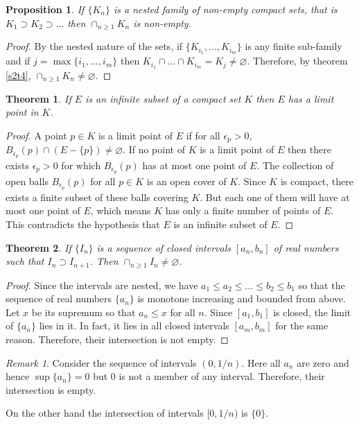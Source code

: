 \documentclass{article}
\theoremstyle{plain}
\newtheorem{thm}{Theorem}
\numberwithin{thm}{section}
\theoremstyle{plain}
\newtheorem{prop}{Proposition}
\numberwithin{prop}{section}
\theoremstyle{definition}
\numberwithin{defn}{section}
\theoremstyle{remark}
\newtheorem*{rem}{Remark}
\numberwithin{equation}{section}
\begin{document}
\begin{prop}\label{s2p2}
If $\{K_n\}$ is a nested family of non-empty compact sets, that is $K_1 \supset 
K_2 \supset \ldots$ then $\cap_{n \ge 1} K_n$ is non-empty.
\end{prop}
\begin{proof}
By the nested nature of the sets, if $\{K_{i_1}, \ldots, K_{i_m}\}$ is any
finite sub-family and if $j = \max\{i_1, \ldots, i_m\}$ then $K_{i_1} \cap
\ldots \cap K_{i_m} = K_j \ne \varnothing$. Therefore, by theorem \ref{s2t4},
$\cap_{n \ge 1}K_n \ne \varnothing$.
\end{proof}

\begin{thm}\label{s2t5}
If $E$ is an infinite subset of a compact set $K$ then $E$ has a limit point
in $K$.
\end{thm}
\begin{proof}
A point $p \in K$ is a limit point of $E$ if for all $\epsilon_p > 0$,
$B_{\epsilon_p}(p) \cap (E - \{p\}) \ne \varnothing$. If no point of $K$ is
a limit point of $E$ then there exists $\epsilon_p > 0$ for which 
$B_{\epsilon_p}(p)$ has at most one point of $E$. The collection of open balls
$B_{\epsilon_p}(p)$ for all $p \in K$ is an open cover of $K$. Since $K$ is 
compact, there exists a finite subset of these balls covering $K$. But each one
of them will have at most one point of $E$, which means $K$ has only a finite
number of points of $E$. This contradicts the hypothesis that $E$ is an infinite
subset of $E$.
\end{proof}

\begin{thm}\label{s2t6}
If $\{I_n\}$ is a sequence of closed intervals $[a_n, b_n]$ of real numbers such
that $I_n \supset I_{n+1}$. Then $\cap_{n \ge 1}I_n \ne \varnothing$.
\end{thm}
\begin{proof}
Since the intervals are nested, we have $a_1 \le a_2 \le \ldots \le b_2 \le b_1$
so that the sequence of real numbers $\{a_n\}$ is monotone increasing and 
bounded from above. Let $x$ be its supremum so that $a_n \le x$ for all $n$. 
Since $[a_1, b_1]$ is closed, the limit of $\{a_n\}$ lies in it. In fact, it
lies in all closed intervals $[a_m, b_m]$ for the same reason. Therefore, their
intersection is not empty.
\end{proof}

\begin{rem}
Consider the sequence of intervals $(0, 1/n)$. Here all $a_n$ are zero and hence
$\sup\{a_n\} = 0$ but $0$ is not a member of any interval. Therefore, their
intersection is empty.

On the other hand the intersection of intervals $[0, 1/n)$ is $\{0\}$.
\end{rem}
\end{document}
